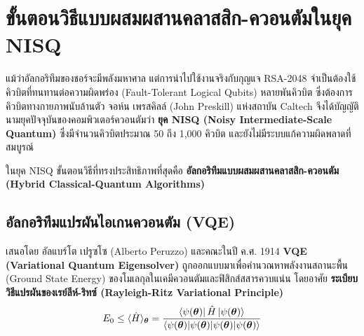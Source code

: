 \section{ขั้นตอนวิธีแบบผสมผสานคลาสสิก-ควอนตัมในยุค NISQ}

แม้ว่าอัลกอริทึมของชอร์จะมีพลังมหาศาล แต่การนำไปใช้งานจริงกับกุญแจ RSA-2048 จำเป็นต้องใช้คิวบิตที่ทนทานต่อความผิดพร่อง (Fault-Tolerant Logical Qubits) หลายพันคิวบิต ซึ่งต้องการคิวบิตทางกายภาพนับล้านตัว จอห์น เพรสคิลล์ (John Preskill) แห่งสถาบัน Caltech จึงได้บัญญัตินามยุคปัจจุบันของคอมพิวเตอร์ควอนตัมว่า \textbf{ยุค NISQ (Noisy Intermediate-Scale Quantum)} ซึ่งมีจำนวนคิวบิตประมาณ 50 ถึง 1,000 คิวบิต และยังไม่มีระบบแก้ความผิดพลาดที่สมบูรณ์

ในยุค NISQ ขั้นตอนวิธีที่ทรงประสิทธิภาพที่สุดคือ \textbf{อัลกอริทึมแบบผสมผสานคลาสสิก-ควอนตัม (Hybrid Classical-Quantum Algorithms)}

\subsection{อัลกอริทึมแปรผันไอเกนควอนตัม (VQE)}
เสนอโดย อัลแบร์โต เปรูซโซ (Alberto Peruzzo) และคณะในปี ค.ศ. 1914 \textbf{VQE (Variational Quantum Eigensolver)} ถูกออกแบบมาเพื่อคำนวณหาพลังงานสถานะพื้น (Ground State Energy) ของโมเลกุลในเคมีควอนตัมและฟิสิกส์สสารควบแน่น โดยอาศัย \textbf{ระเบียบวิธีแปรผันของเรย์ลีห์-ริทซ์ (Rayleigh-Ritz Variational Principle)}
\begin{equation}
E_0 \le \langle \hat{H} \rangle_{\boldsymbol{\theta}} = \frac{\bra{\psi(\boldsymbol{\theta})} \hat{H} \ket{\psi(\boldsymbol{\theta})}}{\braket{\psi(\boldsymbol{\theta})|\psi(\boldsymbol{\theta})}}
\label{eq:vqe_variational_bound}
\end{equation}

